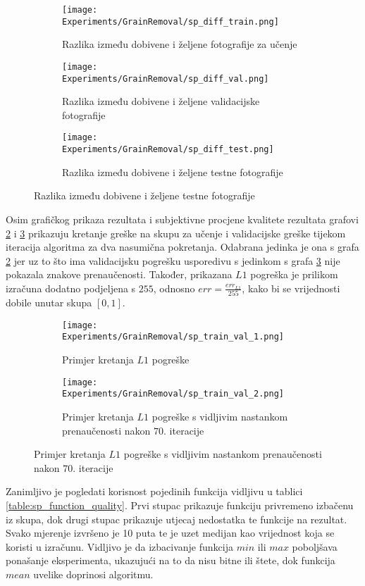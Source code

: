 \begin{figure}
\begin{subfigure}[t]{0.32\textwidth}
		\texttt{[image: Experiments/GrainRemoval/sp\_diff\_train.png]}
		\caption{Razlika između dobivene i željene fotografije za učenje}
	\end{subfigure}
	\begin{subfigure}[t]{0.32\textwidth}
		\texttt{[image: Experiments/GrainRemoval/sp\_diff\_val.png]}
		\caption{Razlika između dobivene i željene validacijske fotografije}
	\end{subfigure}
	\begin{subfigure}[t]{0.32\textwidth}
		\texttt{[image: Experiments/GrainRemoval/sp\_diff\_test.png]}
		\caption{Razlika između dobivene i željene testne fotografije}
	\end{subfigure}
	\label{fig:sp_result_grid}
\end{figure}

Osim grafičkog prikaza rezultata i subjektivne procjene kvalitete rezultata grafovi \ref{fig:sp_train_val_graph_1} i \ref{fig:sp_train_val_graph_2} prikazuju kretanje greške na skupu za učenje i validacijske greške tijekom iteracija algoritma za dva nasumična pokretanja.
Odabrana jedinka je ona s grafa \ref{fig:sp_train_val_graph_1} jer uz to što ima validacijsku pogrešku usporedivu s jedinkom s grafa \ref{fig:sp_train_val_graph_2} nije pokazala znakove prenaučenosti.
Također, prikazana $L1$ pogreška je prilikom izračuna dodatno podjeljena s $255$, odnosno $err = \frac{err_{L1}}{255}$, kako bi se vrijednosti dobile unutar skupa $[0, 1]$.

\begin{figure}
	\centering
	\caption{Grafovi kretanja $L1$ pogreške kroz iteracije algoritma}
	\begin{subfigure}[t]{0.48\textwidth}
		\texttt{[image: Experiments/GrainRemoval/sp\_train\_val\_1.png]}
		\caption{Primjer kretanja $L1$ pogreške}
		\label{fig:sp_train_val_graph_1}
	\end{subfigure}
	\begin{subfigure}[t]{0.48\textwidth}
		\texttt{[image: Experiments/GrainRemoval/sp\_train\_val\_2.png]}
		\caption{Primjer kretanja $L1$ pogreške s vidljivim nastankom prenaučenosti nakon $70.$ iteracije}
		\label{fig:sp_train_val_graph_2}
	\end{subfigure}
	\label{fig:sp_train_val_graph}
\end{figure}

Zanimljivo je pogledati korisnost pojedinih funkcija vidljivu u tablici \ref{table:sp_function_quality}.
Prvi stupac prikazuje funkciju privremeno izbačenu iz skupa, dok drugi stupac prikazuje utjecaj nedostatka te funkcije na rezultat.
Svako mjerenje izvršeno je 10 puta te je uzet medijan kao vrijednost koja se koristi u izračunu.
Vidljivo je da izbacivanje funkcija $min$ ili $max$ poboljšava ponašanje eksperimenta, ukazujući na to da nisu bitne ili štete, dok funkcija $mean$ uvelike doprinosi algoritmu.

